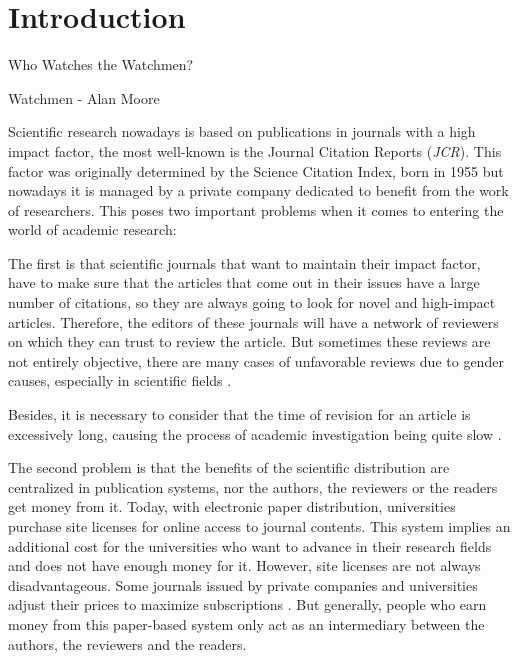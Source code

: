 \chapter{Introduction}
\label{intro}
\begin{FraseCelebre}
  \begin{Frase}
    Who Watches the Watchmen?
  \end{Frase}
  \begin{Fuente}
    Watchmen - Alan Moore
  \end{Fuente}
\end{FraseCelebre}

Scientific research nowadays is based on publications in journals with a high
impact factor\cite{doi:10.1001/jama.295.1.90}, the most well-known is the
Journal Citation Reports (\emph{JCR}). This factor was originally determined by
the Science Citation Index, born in 1955\cite{garfield2007evolution} but
nowadays it is managed by a private company dedicated to benefit from the work
of researchers\cite{toledo2011book}. This poses two important problems when it
comes to entering the world of academic research:

The first is that scientific journals that want to maintain their impact factor,
have to make sure that the articles that come out in their issues have a large
number of citations, so they are always going to look for novel and high-impact
articles. Therefore, the editors of these journals will have a network of
reviewers on which they can trust to review the article. But sometimes these
reviews are not entirely objective, there are many cases of unfavorable reviews
due to gender causes, especially in scientific fields
\cite{wenneras2001nepotism}.

Besides, it is necessary to consider that the time of revision for an article is
excessively long, causing the process of academic investigation being quite slow
\cite{huisman2017duration}.

The second problem is that the benefits of the scientific distribution are
centralized in publication systems, nor the authors, the reviewers or the
readers get money from it. Today, with electronic paper distribution,
universities purchase site licenses for online access to journal contents. This
system implies an additional cost for the universities who want to advance in
their research fields and does not have enough money for it. However, site
licenses are not always disadvantageous. Some journals issued by private
companies and universities adjust their prices to maximize subscriptions
\cite{bergstrom2004costs}. But generally, people who earn money from this
paper-based system only act as an intermediary between the authors, the
reviewers and the readers.

